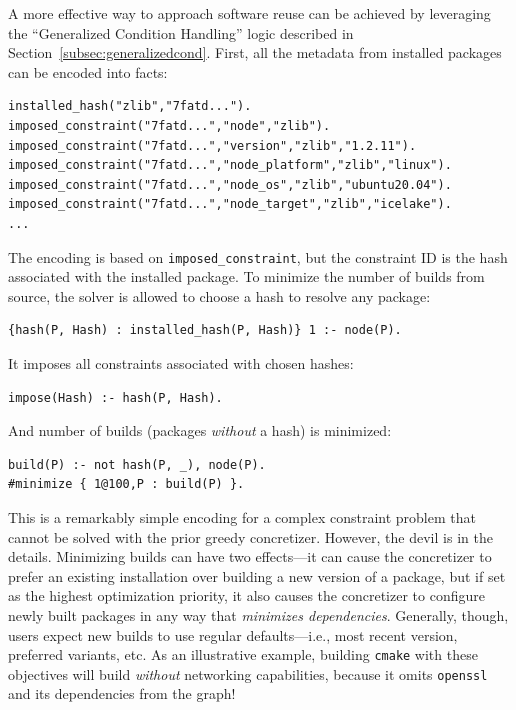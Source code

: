 
A more effective way to approach software reuse can be achieved by leveraging the
``Generalized Condition Handling'' logic described in
Section~\ref{subsec:generalizedcond}. First, all the metadata from installed packages
can be encoded into facts:
\begin{verbatim}
installed_hash("zlib","7fatd...").
imposed_constraint("7fatd...","node","zlib").
imposed_constraint("7fatd...","version","zlib","1.2.11").
imposed_constraint("7fatd...","node_platform","zlib","linux").
imposed_constraint("7fatd...","node_os","zlib","ubuntu20.04").
imposed_constraint("7fatd...","node_target","zlib","icelake").
...
\end{verbatim}
The encoding is based on \texttt{imposed\_constraint}, but the constraint ID is the
hash associated with the installed package. To minimize the number of builds from
source, the solver is allowed to choose a hash to resolve any package:
\begin{verbatim}
{hash(P, Hash) : installed_hash(P, Hash)} 1 :- node(P).
\end{verbatim}
It imposes all constraints associated with chosen hashes:
\begin{verbatim}
impose(Hash) :- hash(P, Hash).
\end{verbatim}
And number of builds (packages \emph{without} a hash) is minimized:
\begin{verbatim}
build(P) :- not hash(P, _), node(P).
#minimize { 1@100,P : build(P) }.
\end{verbatim}

This is a remarkably simple encoding for a complex constraint problem that cannot be
solved with the prior greedy concretizer. However, the devil is in the details.
Minimizing builds can have two effects---it can cause the concretizer to prefer an
existing installation over building a new version of a package, but if set as the
highest optimization priority, it also causes the concretizer to configure newly built
packages in any way that {\it minimizes dependencies}. Generally, though, users expect
new builds to use regular defaults---i.e., most recent version, preferred variants, etc.
As an illustrative example, building \texttt{cmake} with these objectives will build
{\it without} networking capabilities, because it omits \texttt{openssl} and its
dependencies from the graph!


